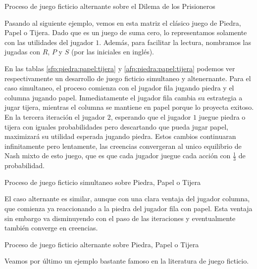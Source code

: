\begin{table} %
    \centering
    
    \caption{Proceso de juego ficticio alternante sobre el Dilema de los Prisioneros}
    \label{afp:dilema:prisioneros}
\end{table}

Pasando al siguiente ejemplo, vemos en esta matriz el clásico juego de Piedra, Papel o Tijera. Dado que es un juego de suma cero, lo representamos solamente con las utilidades del jugador $1$. Además, para facilitar la lectura, nombramos las jugadas con $R$, $P$ y $S$ (por las iniciales en inglés).



En las tablas \ref{sfp:piedra:papel:tijera} y \ref{afp:piedra:papel:tijera} podemos ver respectivamente un desarrollo de juego ficticio simultaneo y altenernante. Para el caso simultaneo, el proceso comienza con el jugador fila jugando piedra y el columna jugando papel. Inmediatamente el jugador fila cambia su estrategia a jugar tijera, mientras el columna se mantiene en papel porque lo proyecta exitoso. En la tercera iteración el jugador $2$, esperando que el jugador $1$ juegue piedra o tijera con iguales probabilidades pero descartando que pueda jugar papel, maximizará su utilidad esperada jugando piedra. Estos cambios continuaran infinitamente pero lentamente, las creencias convergeran al unico equilibrio de Nash mixto de esto juego, que es que cada jugador juegue cada acción con $\frac{1}{3}$ de probabilidad. 

\begin{table} %
    \centering
    
    \caption{Proceso de juego ficticio simultaneo sobre Piedra, Papel o Tijera}
    \label{sfp:piedra:papel:tijera}
\end{table}

El caso alternante es similar, aunque con una clara ventaja del jugador columna, que comienza ya reaccionando a la piedra del jugador fila con papel. Esta ventaja sin embargo va disminuyendo con el paso de las iteraciones y eventualmente también converge en creencias.


\begin{table} %
    \centering
    
    \caption{Proceso de juego ficticio alternante sobre Piedra, Papel o Tijera}
    \label{afp:piedra:papel:tijera}
\end{table}

Veamos por último un ejemplo bastante famoso en la literatura de juego ficticio.

